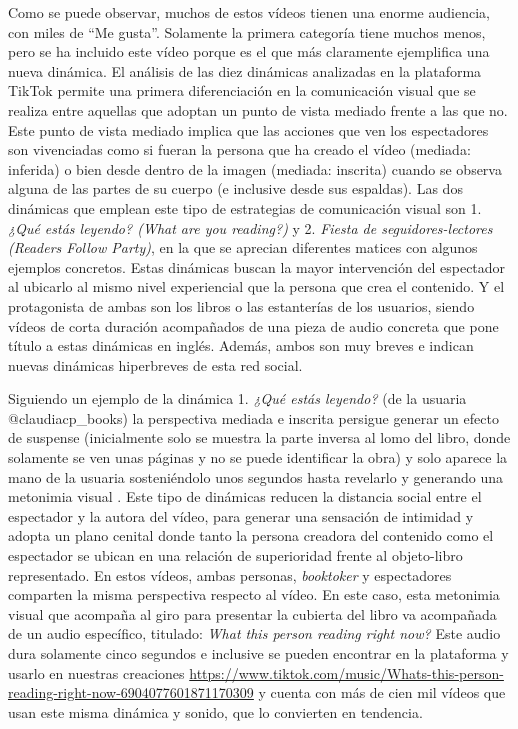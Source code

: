 Como se puede observar, muchos de estos vídeos tienen una enorme
audiencia, con miles de ``Me gusta''. Solamente la primera categoría
tiene muchos menos, pero se ha incluido este vídeo porque es el que más
claramente ejemplifica una nueva dinámica. El análisis de las diez
dinámicas analizadas en la plataforma TikTok permite una primera
diferenciación en la comunicación visual que se realiza entre aquellas
que adoptan un punto de vista mediado frente a las que no. Este punto de
vista mediado implica que las acciones que ven los espectadores son
vivenciadas como si fueran la persona que ha creado el vídeo (mediada:
inferida) o bien desde dentro de la imagen (mediada: inscrita) cuando se
observa alguna de las partes de su cuerpo (e inclusive desde sus
espaldas). Las dos dinámicas que emplean este tipo de estrategias de
comunicación visual son 1. \emph{¿Qué estás leyendo? (What are you
	reading?)} y 2. \emph{Fiesta de seguidores-lectores (Readers Follow
	Party)}, en la que se aprecian diferentes matices con algunos ejemplos
concretos. Estas dinámicas buscan la mayor intervención del espectador
al ubicarlo al mismo nivel experiencial que la persona que crea el
contenido. Y el protagonista de ambas son los libros o las estanterías
de los usuarios, siendo vídeos de corta duración acompañados de una
pieza de audio concreta que pone título a estas dinámicas en inglés.
Además, ambos son muy breves e indican nuevas dinámicas hiperbreves de
esta red social.

Siguiendo un ejemplo de la dinámica 1. \emph{¿Qué estás leyendo?} (de la
usuaria @claudiacp\_books) la perspectiva mediada e inscrita persigue
generar un efecto de suspense (inicialmente solo se muestra la parte
inversa al lomo del libro, donde solamente se ven unas páginas y no se
puede identificar la obra) y solo aparece la mano de la usuaria
sosteniéndolo unos segundos hasta revelarlo y generando una metonimia
visual \cite{moya-Guijarro}. Este tipo de dinámicas reducen la
distancia social entre el espectador y la autora del vídeo, para generar
una sensación de intimidad y adopta un plano cenital donde tanto la
persona creadora del contenido como el espectador se ubican en una
relación de superioridad frente al objeto-libro representado. En estos
vídeos, ambas personas, \emph{booktoker} y espectadores comparten la
misma perspectiva respecto al vídeo. En este caso, esta metonimia visual
que acompaña al giro para presentar la cubierta del libro va acompañada
de un audio específico, titulado: \emph{What this person reading right
	now?} Este audio dura solamente cinco segundos e inclusive se pueden
encontrar en la plataforma y usarlo en nuestras creaciones
\url{https://www.tiktok.com/music/Whats-this-person-reading-right-now-6904077601871170309}
y cuenta con más de cien mil vídeos que usan este misma dinámica y
sonido, que lo convierten en tendencia.

